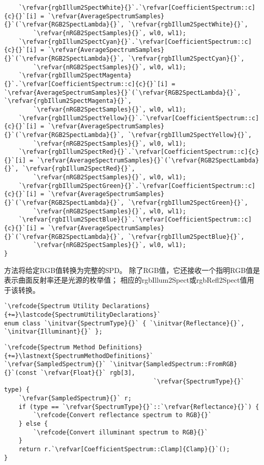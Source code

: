 \begin{lstlisting}
    `\refvar{rgbIllum2SpectWhite}{}`.`\refvar[CoefficientSpectrum::c]{c}{}`[i] = `\refvar{AverageSpectrumSamples}{}`(`\refvar{RGB2SpectLambda}{}`, `\refvar{rgbIllum2SpectWhite}{}`,
        `\refvar{nRGB2SpectSamples}{}`, wl0, wl1);
    `\refvar{rgbIllum2SpectCyan}{}`.`\refvar[CoefficientSpectrum::c]{c}{}`[i] = `\refvar{AverageSpectrumSamples}{}`(`\refvar{RGB2SpectLambda}{}`, `\refvar{rgbIllum2SpectCyan}{}`,
        `\refvar{nRGB2SpectSamples}{}`, wl0, wl1);
    `\refvar{rgbIllum2SpectMagenta}{}`.`\refvar[CoefficientSpectrum::c]{c}{}`[i] = `\refvar{AverageSpectrumSamples}{}`(`\refvar{RGB2SpectLambda}{}`, `\refvar{rgbIllum2SpectMagenta}{}`,
        `\refvar{nRGB2SpectSamples}{}`, wl0, wl1);
    `\refvar{rgbIllum2SpectYellow}{}`.`\refvar[CoefficientSpectrum::c]{c}{}`[i] = `\refvar{AverageSpectrumSamples}{}`(`\refvar{RGB2SpectLambda}{}`, `\refvar{rgbIllum2SpectYellow}{}`,
        `\refvar{nRGB2SpectSamples}{}`, wl0, wl1);
    `\refvar{rgbIllum2SpectRed}{}`.`\refvar[CoefficientSpectrum::c]{c}{}`[i] = `\refvar{AverageSpectrumSamples}{}`(`\refvar{RGB2SpectLambda}{}`, `\refvar{rgbIllum2SpectRed}{}`,
        `\refvar{nRGB2SpectSamples}{}`, wl0, wl1);
    `\refvar{rgbIllum2SpectGreen}{}`.`\refvar[CoefficientSpectrum::c]{c}{}`[i] = `\refvar{AverageSpectrumSamples}{}`(`\refvar{RGB2SpectLambda}{}`, `\refvar{rgbIllum2SpectGreen}{}`,
        `\refvar{nRGB2SpectSamples}{}`, wl0, wl1);
    `\refvar{rgbIllum2SpectBlue}{}`.`\refvar[CoefficientSpectrum::c]{c}{}`[i] = `\refvar{AverageSpectrumSamples}{}`(`\refvar{RGB2SpectLambda}{}`, `\refvar{rgbIllum2SpectBlue}{}`,
        `\refvar{nRGB2SpectSamples}{}`, wl0, wl1);
}
\end{lstlisting}

方法将给定RGB值转换为完整的SPD。
除了RGB值，它还接收一个指明RGB值是表示曲面反射率还是光源的枚举值；
相应的{\ttfamily rgbIllum2Spect}或{\ttfamily rgbRefl2Spect}值用于该转换。
\begin{lstlisting}
`\refcode{Spectrum Utility Declarations}{+=}\lastcode{SpectrumUtilityDeclarations}`
enum class `\initvar{SpectrumType}{}` { `\initvar{Reflectance}{}`, `\initvar{Illuminant}{}` };
\end{lstlisting}
\begin{lstlisting}
`\refcode{Spectrum Method Definitions}{+=}\lastnext{SpectrumMethodDefinitions}`
`\refvar{SampledSpectrum}{}` `\initvar{SampledSpectrum::FromRGB}{}`(const `\refvar{Float}{}` rgb[3],
                                         `\refvar{SpectrumType}{}` type) {
    `\refvar{SampledSpectrum}{}` r;
    if (type == `\refvar{SpectrumType}{}`::`\refvar{Reflectance}{}`) {
        `\refcode{Convert reflectance spectrum to RGB}{}`
    } else {
        `\refcode{Convert illuminant spectrum to RGB}{}`
    }
    return r.`\refvar[CoefficientSpectrum::Clamp]{Clamp}{}`();
}
\end{lstlisting}

